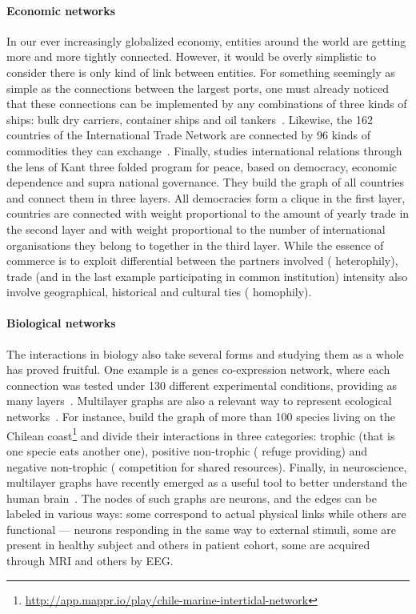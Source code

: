 \paragraph{Economic networks} In our ever increasingly globalized economy, entities around the world
are getting more and more tightly connected. However, it would be overly simplistic to consider
there is only kind of link between entities. For something seemingly as simple as the connections
between the largest  ports, one must already noticed that these connections can be
implemented by any combinations of three kinds of ships: bulk dry carriers, container ships and oil
tankers~\autocite{ports3kindofships10}. Likewise, the 162 countries of the International Trade
Network are connected by 96 kinds of commodities they can exchange~\autocite{worldTradeNetwork10}.
Finally, \textcite{KantPeace15} studies international relations through the lens of Kant three
folded program for peace,  based on democracy, economic dependence and supra national governance.
They build the graph of all countries and connect them in three layers. All democracies form a
clique in the first layer, countries are connected with weight proportional to the amount of yearly
trade in the second layer and with weight proportional to the number of international organisations
they belong to together in the third layer. While the essence of commerce is to exploit differential
between the partners involved (\ie{} heterophily), trade (and in the last example participating in
common institution) intensity also involve geographical, historical and cultural ties (\ie{}
homophily).

\paragraph{Biological networks} The interactions in biology also take several forms and studying
them as a whole has proved fruitful. One example is a genes co-expression network, where each
connection was tested under 130 different experimental conditions, providing as many
layers~\autocite{bioLayerExp11}.
Multilayer graphs are also a relevant way to represent ecological
networks~\autocite{EcologyMultiReview17}. For instance, \textcite{EcoChile15} build the graph of
more than 100 species living on the Chilean
coast\footnote{\url{http://app.mappr.io/play/chile-marine-intertidal-network}} and divide their
interactions in three categories: trophic (that is one specie eats another one), positive
non-trophic (\eg{} refuge providing) and negative non-trophic (\eg{} competition for shared
resources).
Finally, in neuroscience, multilayer graphs have recently emerged as a useful tool to better
understand the human brain~\autocite{Neuroscience16}. The nodes of such graphs are neurons, and the
edges can be labeled in various ways: some correspond to actual physical links while others are
functional ---\ie{} neurons responding in the same way to external stimuli, some are present in
healthy subject and others in patient cohort, some are acquired through MRI and others by EEG.
